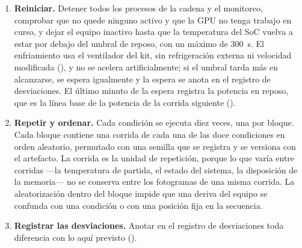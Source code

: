 \begin{enumerate}
        descartes en ninguna frontera; (iii) la temperatura del SoC no varía
        más de 0,5~°C dentro de cada ventana y ninguna ventana entra en
        limitación térmica; (iv) el monitoreo no tiene interrupciones ni
        muestras faltantes dentro de las ventanas; (v) ambas ventanas
        completaron su duración; y (vi) en la ventana saturada la tasa de
        oferta ---los fotogramas que despachó la etapa de adquisición---
        excede con holgura la tasa de completación, de modo que la fuente no
        quedó estrangulada por la espera en las fronteras. Una corrida que no
        cumple alguna de estas
        condiciones no se analiza: se repite al final del bloque, con su
        propio identificador y su entrada en el registro de desviaciones.
  \item \textbf{Reiniciar.} Detener todos los procesos de la cadena y el
        monitoreo, comprobar que no quede ninguno activo y que la GPU no
        tenga trabajo en curso, y dejar el equipo inactivo hasta que la
        temperatura del SoC vuelva a estar por debajo del umbral de reposo,
        con un máximo de 300~s. El enfriamiento usa el ventilador del kit,
        sin refrigeración externa ni velocidad modificada
        (), y no se acelera artificialmente; si el umbral
        tarda más en alcanzarse, se espera igualmente y la espera se anota
        en el registro de desviaciones. El último minuto de la espera registra
        la potencia en reposo, que es la línea base de la potencia de la
        corrida siguiente ().
  \item \textbf{Repetir y ordenar.} Cada condición se ejecuta diez veces,
        una por bloque. Cada bloque contiene una corrida de cada una de las
        doce condiciones en orden aleatorio, permutado con una semilla que se
        registra y se versiona con el artefacto. La corrida es la unidad de
        repetición, porque lo que varía entre corridas ---la temperatura de
        partida, el estado del sistema, la disposición de la memoria--- no se
        conserva entre los fotogramas de una misma corrida. La aleatorización
        dentro del bloque impide que una deriva del equipo se confunda con
        una condición o con una posición fija en la secuencia.
  \item \textbf{Registrar las desviaciones.} Anotar en el registro de
        desviaciones toda diferencia con lo aquí previsto
        ().
\end{enumerate}

